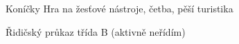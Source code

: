 

\begin{cvskills}

  \cvskill
    {Koníčky} %
    {Hra na žesťové nástroje, četba, pěší turistika} %

  \cvskill
    {Řidičský průkaz} %
    {třída B (aktivně neřídím)} %

\end{cvskills}
